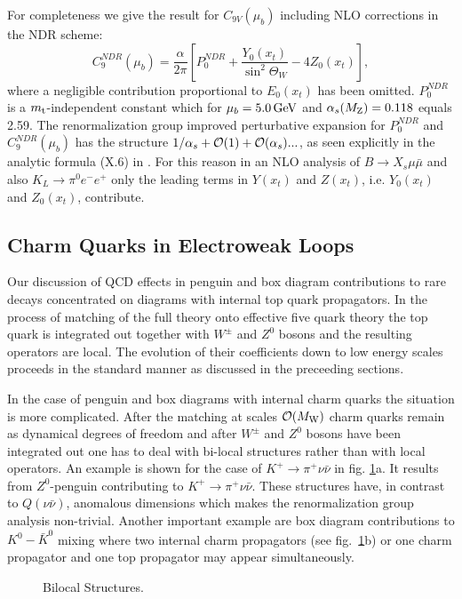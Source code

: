 \documentclass[12pt]{article}
\def\as{\alpha_s}
\newcommand{\mt}{m_{\rm t}}
\newcommand{\mw}{M_{\rm W}}
\newcommand{\mz}{M_{\rm Z}}
\newcommand{\gev}{\, {\rm GeV}}
\newcommand{\aem}{\alpha}
\newcommand{\ord}{{\cal O}}
\def\kpn{K^+\rightarrow\pi^+\nu\bar\nu}
\begin{document}
\begin{itemize}
\begin{itemize}
For completeness we give the result for $C_{9V}(\mu_b)$ including
NLO corrections in the NDR scheme:
\begin{equation}\label{C9tilde}
C_9^{NDR}(\mu_b)  = \frac{\aem}{2\pi}\left[  
P_0^{NDR} + \frac{Y_0(x_t)}{\sin^2\Theta_W} -4 Z_0(x_t)\right],
\end{equation}
where a negligible contribution proportional to $E_0(x_t)$ has been 
omitted.
$P_0^{NDR}$ is a $\mt$-independent constant which for $\mu_b=5.0 \gev$
and $\as(\mz)=0.118$ equals 2.59. 
The renormalization group improved perturbative expansion for
$P_0^{NDR}$ and $C_9^{NDR}(\mu_b)$ has the structure
$1/\as+\ord(1)+\ord(\as)...$, as seen explicitly in the analytic
formula (X.6) in \cite{BBL}. For this reason in an NLO analysis of
$B\to X_s\mu\bar\mu$ and also $K_L \to\pi^0 e^-e^+$ 
only the leading terms in $Y(x_t)$ and $Z(x_t)$,
i.e. $Y_0(x_t)$ and $Z_0(x_t)$, contribute. 
\subsection{Charm Quarks in Electroweak Loops}
Our discussion of QCD effects in penguin and box diagram contributions
to rare decays concentrated on diagrams with internal top quark
propagators. In the process of matching of the full theory onto
effective five quark theory the top quark is integrated out together
with $W^\pm$ and $Z^0$ bosons and the resulting operators 
are local. The
evolution of their coefficients down to low energy scales proceeds
in the standard manner as discussed in the preceeding sections.

In the case of penguin and box diagrams with internal charm quarks
the situation is more complicated. After the matching at scales
$\ord(\mw)$ charm quarks remain as dynamical degrees of freedom
and after $W^\pm$ and $Z^0$ bosons have been integrated out one has to
deal with bi-local structures rather than with local operators.
An example is shown for the case of $\kpn$ in fig. \ref{L:11}a. 
It results from $Z^0$-penguin contributing to $K^+\to\pi^+\nu\bar\nu$.
These
structures have, in contrast to $Q(\nu\bar\nu)$, anomalous
dimensions which makes the renormalization group analysis
non-trivial. 
Another important example are box diagram contributions to
$K^0-\bar K^0$ mixing where two internal charm propagators 
(see fig.~\ref{L:11}b) or
one charm propagator and one top propagator may appear simultaneously.

\begin{figure}[hbt]
\vspace{0.10in}
\centerline{
\epsfysize=2in
}%
\vspace{0.08in}
\caption[]{Bilocal Structures. 
\label{L:11}}
\end{figure}


\end{itemize}
\end{itemize}
\end{document}

